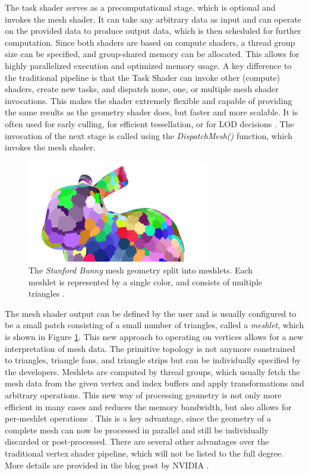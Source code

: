 \noindent
The task shader serves as a precomputational stage, which is optional and invokes the mesh shader. It can 
take any arbitrary data as input and can operate on the provided data to produce output data, which is then 
scheduled for further computation. Since both shaders are based on compute shaders, a thread group size can 
be specified, and group-shared memory can be allocated. This allows for highly parallelized execution and 
optimized memory usage. A key difference to the traditional pipeline is that the Task Shader can invoke other 
(compute) shaders, create new tasks, and dispatch none, one, or multiple mesh shader invocations. This makes 
the shader extremely flexible and capable of providing the same results as the geometry shader does, but 
faster and more scalable. It is often used for early culling, for efficient tessellation, or for \ac{LOD} 
decisions \cite{Kubisch2018}. The invocation of the next stage is called using the \emph{DispatchMesh()} 
function, which invokes the mesh shader. \\

\begin{figure}[h]
    \centering
    \includegraphics[width=300px]{images/graphics/bunny-meshlet.jpg}
    \caption{The \emph{Stanford Bunny} mesh geometry split into meshlets. Each meshlet is represented by a single color, 
    and consists of multiple triangles \cite{Oberberger2024}.}
    \label{fig:bunny-meshlet}
\end{figure}

\noindent
The mesh shader output can be defined by the user and is usually configured to be a small patch consisting of a small 
number of triangles, called a \emph{meshlet}, which is shown in Figure \ref{fig:bunny-meshlet}. This new approach 
to operating on vertices allows for a new interpretation of mesh data. The primitive topology is not anymore constrained 
to triangles, triangle fans, and triangle strips but can be individually specified by the developers.
Meshlets are computed by thread groups, which usually fetch the mesh data from the given vertex and index buffers and 
apply transformations and arbitrary operations. This new way of processing geometry is not only more efficient in many 
cases and reduces the memory bandwidth, but also allows for per-meshlet operations \cite{Kubisch2020}. This is a key 
advantage, since the geometry of a complete mesh can now be processed in parallel and still be individually discarded 
or post-processed. There are several other advantages over the traditional vertex shader pipeline, which will not be 
listed to the full degree. More details are provided in the blog post by NVIDIA \cite{Kubisch2020}.\\


